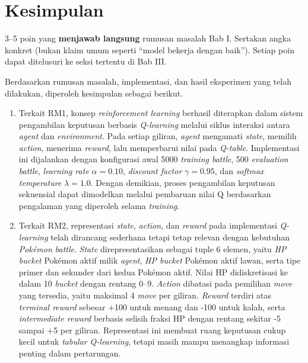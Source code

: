 \documentclass[11pt,a4paper,oneside]{report}
\begin{document}
\section{Kesimpulan}
\begin{petunjuk}
3--5 poin yang \textbf{menjawab langsung} rumusan masalah Bab I. Sertakan angka konkret (bukan klaim umum seperti ``model bekerja dengan baik''). Setiap poin dapat ditelusuri ke seksi tertentu di Bab III.
\end{petunjuk}

Berdasarkan rumusan masalah, implementasi, dan hasil eksperimen yang telah dilakukan, diperoleh kesimpulan sebagai berikut.

\begin{enumerate}[leftmargin=*]
    \item Terkait RM1, konsep \textit{reinforcement learning} berhasil diterapkan dalam sistem pengambilan keputusan berbasis \textit{Q-learning} melalui siklus interaksi antara \textit{agent} dan \textit{environment}. Pada setiap giliran, \textit{agent} mengamati \textit{state}, memilih \textit{action}, menerima \textit{reward}, lalu memperbarui nilai pada \textit{Q-table}. Implementasi ini dijalankan dengan konfigurasi awal 5000 \textit{training battle}, 500 \textit{evaluation battle}, \textit{learning rate} $\alpha = 0.10$, \textit{discount factor} $\gamma = 0.95$, dan \textit{softmax temperature} $\lambda = 1.0$. Dengan demikian, proses pengambilan keputusan sekuensial dapat dimodelkan melalui pembaruan nilai Q berdasarkan pengalaman yang diperoleh selama \textit{training}.

    \item Terkait RM2, representasi \textit{state}, \textit{action}, dan \textit{reward} pada implementasi \textit{Q-learning} telah dirancang sederhana tetapi tetap relevan dengan kebutuhan \textit{Pokémon battle}. \textit{State} direpresentasikan sebagai tuple 6 elemen, yaitu \textit{HP bucket} Pokémon aktif milik \textit{agent}, \textit{HP bucket} Pokémon aktif lawan, serta tipe primer dan sekunder dari kedua Pokémon aktif. Nilai HP didiskretisasi ke dalam 10 \textit{bucket} dengan rentang 0--9. \textit{Action} dibatasi pada pemilihan \textit{move} yang tersedia, yaitu maksimal 4 \textit{move} per giliran. \textit{Reward} terdiri atas \textit{terminal reward} sebesar +100 untuk menang dan -100 untuk kalah, serta \textit{intermediate reward} berbasis selisih fraksi HP dengan rentang sekitar -5 sampai +5 per giliran. Representasi ini membuat ruang keputusan cukup kecil untuk \textit{tabular Q-learning}, tetapi masih mampu menangkap informasi penting dalam pertarungan.


\end{enumerate}
\end{document}
